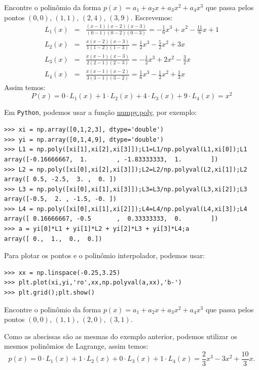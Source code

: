 \begin{ex}Encontre o polinômio da forma $p(x)=a_1+a_2x+a_3x^2+a_4x^3$ que passa pelos pontos $(0, 0)$, $(1, 1)$, $(2, 4)$, $(3, 9)$.
Escrevemos:
\begin{eqnarray*}
L_1(x)&=& \frac{(x-1)(x-2)(x-3)}{(0-1)(0-2)(0-3)}=-\frac{1}{6}x^3+x^2-\frac{11}{6}x+1\\
L_2(x)&=& \frac{x(x-2)(x-3)}{1(1-2)(1-3)}=\frac{1}{2}x^3-\frac{5}{2}x^2+3x\\
L_3(x)&=& \frac{x(x-1)(x-3)}{2(2-1)(2-3)}=-\frac{1}{2}x^3+2x^2-\frac{3}{2}x\\
L_4(x)&=& \frac{x(x-1)(x-2)}{3(3-1)(3-2)}=\frac{1}{6}x^3-\frac{1}{2}x^2+\frac{1}{3}x
\end{eqnarray*}
Assim temos:
\begin{equation*}
  P(x)=0\cdot L_1(x)+1\cdot L_2(x)+4\cdot L_3(x)+9\cdot L_4(x)=x^2
\end{equation*}

\ifispython
Em \verb+Python+, podemos usar a função \href{https://docs.scipy.org/doc/numpy/reference/generated/numpy.poly.html}{numpy.poly}, por exemplo:
\begin{verbatim}
>>> xi = np.array([0,1,2,3], dtype='double')
>>> yi = np.array([0,1,4,9], dtype='double')
>>> L1 = np.poly([xi[1],xi[2],xi[3]]);L1=L1/np.polyval(L1,xi[0]);L1
array([-0.16666667,  1.        , -1.83333333,  1.        ])
>>> L2 = np.poly([xi[0],xi[2],xi[3]]);L2=L2/np.polyval(L2,xi[1]);L2
array([ 0.5, -2.5,  3. ,  0. ])
>>> L3 = np.poly([xi[0],xi[1],xi[3]]);L3=L3/np.polyval(L3,xi[2]);L3
array([-0.5,  2. , -1.5, -0. ])
>>> L4 = np.poly([xi[0],xi[1],xi[2]]);L4=L4/np.polyval(L4,xi[3]);L4
array([ 0.16666667, -0.5       ,  0.33333333,  0.        ])
>>> a = yi[0]*L1 + yi[1]*L2 + yi[2]*L3 + yi[3]*L4;a
array([ 0.,  1.,  0.,  0.])
\end{verbatim}
Para plotar os pontos e o polinômio interpolador, podemos usar:
\begin{verbatim}
>>> xx = np.linspace(-0.25,3.25)
>>> plt.plot(xi,yi,'ro',xx,np.polyval(a,xx),'b-')
>>> plt.grid();plt.show()
\end{verbatim}
\fi
\end{ex}

\begin{ex}Encontre o polinômio da forma $p(x)=a_1+a_2x+a_3x^2+a_4x^3$ que passa pelos pontos $(0, 0)$, $(1, 1)$, $(2, 0)$, $(3, 1)$.
\end{ex}
\begin{sol}
Como as abscissas são as mesmas do exemplo anterior, podemos utilizar os mesmos polinômios de Lagrange, assim temos:
\begin{equation*}
  p(x)=0\cdot L_1(x)+1\cdot L_2(x)+0\cdot L_3(x)+1\cdot L_4(x)=\frac{2}{3}x^3-3x^2+\frac{10}{3}x.
\end{equation*}
\end{sol}

